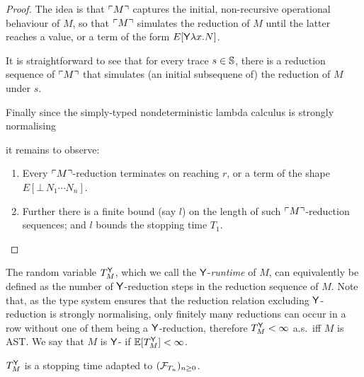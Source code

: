 \begin{proof}
The idea is that ${\ulcorner{M}\urcorner}$ captures the initial, non-recursive operational behaviour of $M$, so that ${\ulcorner{M}\urcorner}$ simulates the reduction of $M$ until the latter reaches a value, or a term of the form $E[\mathsf{Y} \lambda x. N]$.

It is straightforward to see that for every trace $s \in {\mathbb{S}}$, there is a reduction sequence of ${\ulcorner{M}\urcorner}$ that simulates (an initial subsequene of) the reduction of $M$ under $s$.

Finally since the simply-typed nondeterministic lambda calculus is strongly normalising \citep{DBLP:conf/lfcs/Groote94}
\iffalse
thanks to the following
\begin{therm}[\cite{DBLP:conf/lfcs/Groote94}]
\label{thm:de groote}
The simply-typed nondeterministic lambda calculus is strongly normalising. \qed
\end{therm}
\fi
it remains to observe:
\begin{enumerate}
\item Every ${\ulcorner{M}\urcorner}$-reduction terminates on reaching $r$, or a term of the shape $E[\bot \, N_1 \cdots N_n]$.

\item Further there is a finite bound (say $l$) on the length of such ${\ulcorner{M}\urcorner}$-reduction sequences; and $l$ bounds the stopping time $T_1$.
\end{enumerate}
\end{proof}

The random variable $T_M^{\mathsf{Y}}$, which we call the $\mathsf{Y}$-\emph{runtime} of $M$, can equivalently be defined as the number of $\mathsf{Y}$-reduction steps in the reduction sequence of $M$. 
Note that, as the type system ensures that the reduction relation excluding $\mathsf{Y}$-reduction is strongly normalising, only finitely many reductions can occur in a row without one of them being a $\mathsf{Y}$-reduction, therefore $T_M^{\mathsf{Y}} < \infty$ a.s.~iff $M$ is AST. 
We say that $M$ is $\mathsf{Y}$- if $\mathbb{E}[T^{\mathsf{Y}}_M] < \infty$.

\begin{lemma}
\label{lem:TMtY is a stopping time}
$T_M^{\mathsf{Y}}$ is a stopping time adapted to $(\mathcal{F}_{T_n})_{n \geq 0}$.
\end{lemma}

